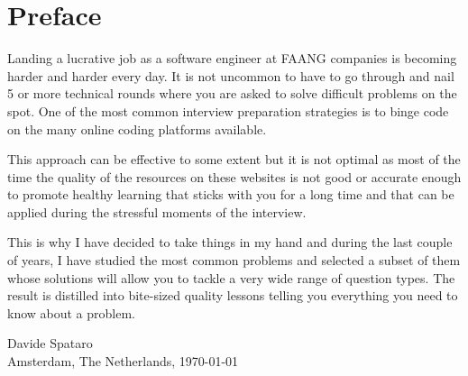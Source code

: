 \chapter*{Preface}
Landing a lucrative job as a software engineer at FAANG companies is becoming harder and harder every day. It is not uncommon to have to go through and nail 5 or more technical rounds where you are asked to solve difficult problems on the spot.
One of the most common interview preparation strategies is to binge code on the many online coding platforms available.

This approach can be effective to some extent but it is not optimal as most of the time the quality of the resources on these websites is not good or accurate enough to promote healthy learning that sticks with you for a long time and that can be applied during the stressful moments of the interview.

This is why I have decided to take things in my hand and during the last couple of years, I have studied the most common problems and selected a subset of them whose solutions will allow you to tackle a very wide range of question types. The result is distilled into bite-sized quality lessons telling you everything you need to know about a problem.


\medskip
\begin {flushright}
  Davide Spataro \hfill \\
  Amsterdam, The Netherlands, \today
\end {flushright}